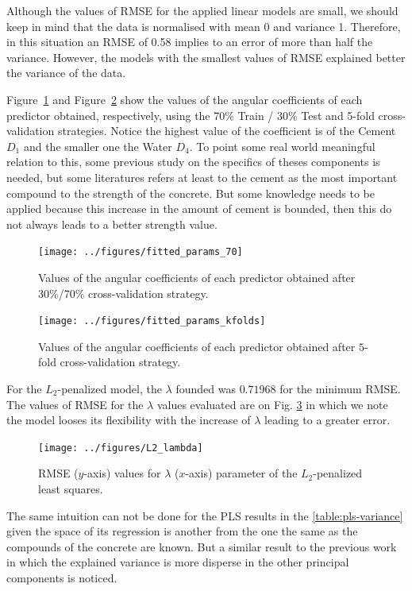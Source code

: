 \documentclass[conference]{IEEEtran}
\begin{document}
Although the values of RMSE for the applied linear models are small, we should keep in mind that the data is normalised with mean 0 and variance 1. Therefore, in this situation an RMSE of 0.58 implies to an error of more than half the variance. However, the models with the smallest values of RMSE explained better the variance of the data.

Figure~\ref{fig:angular_coefficients_1} and Figure~\ref{fig:angular_coefficients_2} show the values of the angular coefficients of each predictor obtained, respectively, using the 70\% Train / 30\% Test and 5-fold cross-validation strategies. Notice the highest value of the coefficient is of the Cement $D_1$ and the smaller one the Water $D_4$. To point some real world meaningful relation to this, some previous study on the specifics of theses components is needed, but some literatures \cite{b1} refers at least to the cement as the most important compound to the strength of the concrete. But some knowledge needs to be applied because this increase in the amount of cement is bounded, then this do not always leads to a better strength value\cite{b4}.
%
\begin{figure}[!h] 
  \centerline{\texttt{[image: ../figures/fitted\_params\_70]}}
  \caption{Values of the angular coefficients of each predictor obtained after 30\%/70\% cross-validation strategy.}
  \label{fig:angular_coefficients_1}
  \end{figure}
  \begin{figure}[!h]
  \centerline{\texttt{[image: ../figures/fitted\_params\_kfolds]}}
  \caption{Values of the angular coefficients of each predictor obtained after $5$-fold cross-validation strategy.}
  \label{fig:angular_coefficients_2}
  \vskip-5pt
\end{figure}

For the $L_2$-penalized model, the $\lambda$ founded was $0.71968$ for the minimum RMSE. The values of RMSE for the $\lambda$ values evaluated are on Fig. \ref{fig:L2_lambda} in which we note the model looses its flexibility with the increase of $\lambda$ leading to a greater error.
%


\begin{figure}[!h] 
\centerline{\texttt{[image: ../figures/L2\_lambda]}}
\caption{RMSE ($y$-axis) values for $\lambda$ ($x$-axis) parameter of the $L_2$-penalized least squares.}
\label{fig:L2_lambda}
\end{figure}

The same intuition can not be done for the PLS results in the \autoref{table:pls-variance} given the space of its regression is another from the one the same as the compounds of the concrete are known. But a similar result to the previous work in which the explained variance is more disperse in the other principal components is noticed. 
\end{document}
